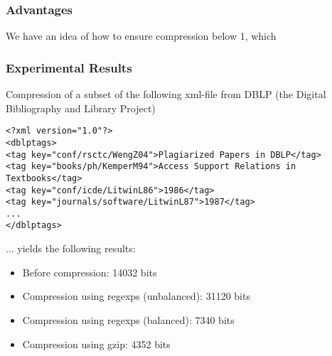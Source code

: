 \documentclass[slidestop,compress,mathserif, xcolor=table]{beamer}
\begin{document}
\begin{frame}
  \frametitle{Advantages}

  We have an idea of how to ensure compression below 1, which
\end{frame}

\begin{frame}[fragile]
  \frametitle{Experimental Results}

  Compression of a subset of the following xml-file from DBLP (the Digital Bibliography and Library Project)

{\tiny
\begin{verbatim}
<?xml version="1.0"?>
<dblptags>
<tag key="conf/rsctc/WengZ04">Plagiarized Papers in DBLP</tag>
<tag key="books/ph/KemperM94">Access Support Relations in Textbooks</tag>
<tag key="conf/icde/LitwinL86">1986</tag>
<tag key="journals/software/LitwinL87">1987</tag>
...
</dblptags>
\end{verbatim}
} 

  ... yields the following results:

  \begin{itemize}
  \item Before compression: 14032 bits
  \item Compression using regexps (unbalanced): 31120 bits
  \item Compression using regexps (balanced): 7340 bits
  \item Compression using gzip: 4352 bits
  \end{itemize}

\end{frame}


     



  
  
\end{document}
